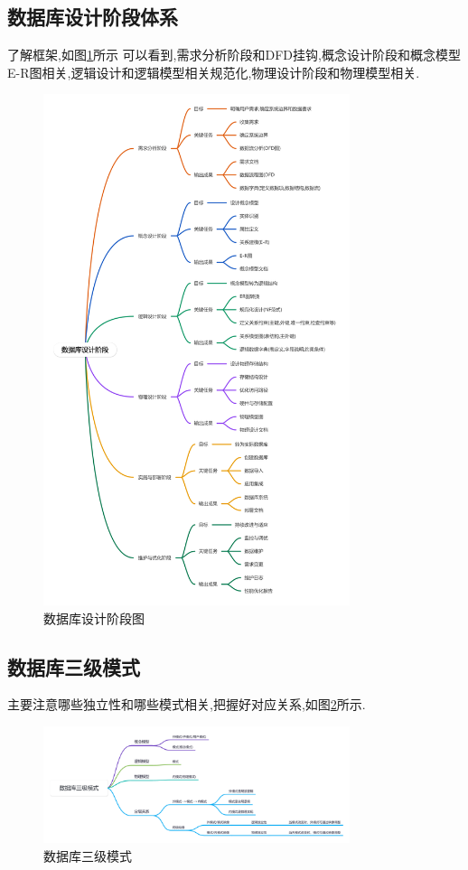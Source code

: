 \documentclass[a4paper,12pt,UTF8,fontset=none]{ctexart}
\begin{document}
\subsection{数据库设计阶段体系}
了解框架,如图\ref{fig:database-design}所示
可以看到,需求分析阶段和DFD挂钩,概念设计阶段和概念模型E-R图相关,逻辑设计和逻辑模型相关规范化,物理设计阶段和物理模型相关.
\FloatBarrier
\begin{figure}[H]
  \centering
  \includegraphics[width=0.8\textwidth]{static/images/数据库设计阶段图.png}
  \caption{数据库设计阶段图}
  \label{fig:database-design}
\end{figure}

\subsection{数据库三级模式}
主要注意哪些独立性和哪些模式相关,把握好对应关系,如图\ref{fig:database-three-level-mode}所示.
\FloatBarrier
\begin{figure}[H]
  \centering
  \includegraphics[width=0.8\textwidth]{static/images/数据库三级模式.png}
  \caption{数据库三级模式}
  \label{fig:database-three-level-mode}
\end{figure}
\end{document}
